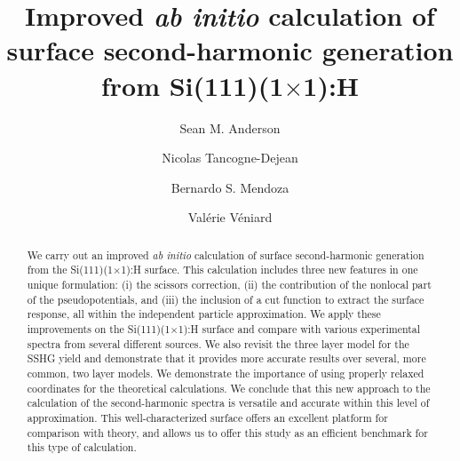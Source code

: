 \documentclass[prb,superscriptaddress,showpacs,twocolumn,letterpaper]{revtex4}
\begin{document}
\title{Improved \emph{ab initio} calculation of surface second-harmonic
generation from Si(111)(1$\times$1):H}

\author{Sean M. Anderson}
\author{Nicolas Tancogne-Dejean}
\author{Bernardo S. Mendoza}
\author{Val\'erie V\'eniard}

\begin{abstract}
We carry out an improved \emph{ab initio} calculation of surface second-harmonic
generation from the Si(111)(1$\times$1):H surface. This calculation includes
three new features in one unique formulation: (i) the scissors correction, (ii)
the contribution of the nonlocal part of the pseudopotentials, and (iii) the
inclusion of a cut function to extract the surface response, all within the
independent particle approximation. We apply these improvements on the
Si(111)(1$\times$1):H surface and compare with various experimental spectra from
several different sources. We also revisit the three layer model for the SSHG
yield and demonstrate that it provides more accurate results over several, more
common, two layer models. We demonstrate the importance of using properly
relaxed coordinates for the theoretical calculations. We conclude that this new
approach to the calculation of the second-harmonic spectra is versatile and
accurate within this level of approximation. This well-characterized surface
offers an excellent platform for comparison with theory, and allows us to offer
this study as an efficient benchmark for this type of calculation.
\end{abstract}


\maketitle
\end{document}
